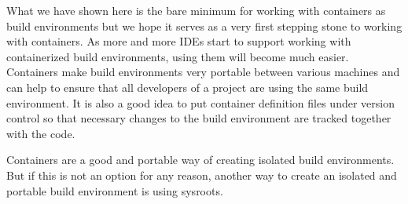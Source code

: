 What we have shown here is the bare minimum for working with containers as build environments but we hope it serves as a very first stepping stone to working with containers. As more and more IDEs start to support working with containerized build environments, using them will become much easier. Containers make build environments very portable between various machines and can help to ensure that all developers of a project are using the same build environment. It is also a good idea to put container definition files under version control so that necessary changes to the build environment are tracked together with the code.

Containers are a good and portable way of creating isolated build environments. But if this is not an option for any reason, another way to create an isolated and portable build environment is using sysroots.



















